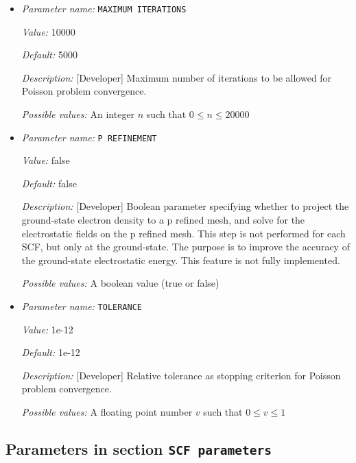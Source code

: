 \begin{itemize}
\item {\it Parameter name:} {\tt MAXIMUM ITERATIONS}
\label{parameters:Poisson problem parameters/MAXIMUM ITERATIONS}
\label{parameters:Poisson_20problem_20parameters/MAXIMUM_20ITERATIONS}


{\it Value:} 10000


{\it Default:} 5000


{\it Description:} [Developer] Maximum number of iterations to be allowed for Poisson problem convergence.


{\it Possible values:} An integer $n$ such that $0\leq n \leq 20000$
\item {\it Parameter name:} {\tt P REFINEMENT}
\label{parameters:Poisson problem parameters/P REFINEMENT}
\label{parameters:Poisson_20problem_20parameters/P_20REFINEMENT}


{\it Value:} false


{\it Default:} false


{\it Description:} [Developer] Boolean parameter specifying whether to project the ground-state electron density to a p refined mesh, and solve for the electrostatic fields on the p refined mesh. This step is not performed for each SCF, but only at the ground-state. The purpose is to improve the accuracy of the ground-state electrostatic energy. This feature is not fully implemented.


{\it Possible values:} A boolean value (true or false)
\item {\it Parameter name:} {\tt TOLERANCE}
\label{parameters:Poisson problem parameters/TOLERANCE}
\label{parameters:Poisson_20problem_20parameters/TOLERANCE}


{\it Value:} 1e-12


{\it Default:} 1e-12


{\it Description:} [Developer] Relative tolerance as stopping criterion for Poisson problem convergence.


{\it Possible values:} A floating point number $v$ such that $0 \leq v \leq 1$
\end{itemize}

\subsection{Parameters in section \tt SCF parameters}
\label{parameters:SCF_20parameters}

